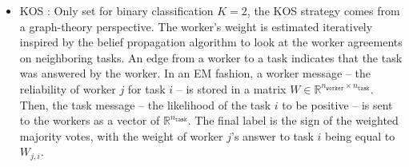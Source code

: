 \documentclass{cap2024}
\begin{document}
\begin{itemize}
  \item KOS \citep{karger2011iterative}: Only set for binary classification $K=2$, the KOS strategy comes from a graph-theory perspective.
  The worker's weight is estimated iteratively inspired by the belief propagation algorithm \citep{pearlBelief} to look at the worker agreements on neighboring tasks.
  An edge from a worker to a task indicates that the task was answered by the worker.
  In an EM fashion, a worker message -- the reliability of worker $j$ for task $i$ -- is stored in a matrix $W \in \mathbb{R}^{n_\texttt{worker}\times n_\texttt{task}}$.
  Then, the task message -- the likelihood of the task $i$ to be positive -- is sent to the workers as a vector of $\mathbb{R}^{n_\texttt{task}}$.
  The final label is the sign of the weighted majority votes, with the weight of worker $j$'s answer to task $i$ being equal to $W_{j,i}$.



\end{itemize}
\end{document}
